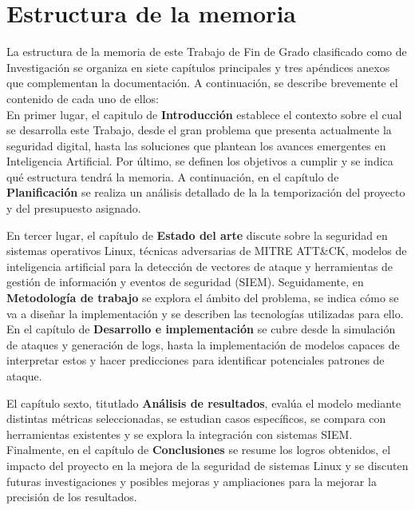 
\section{Estructura de la memoria}

La estructura de la memoria de este Trabajo de Fin de Grado clasificado como de Investigación se organiza en siete capítulos principales y tres apéndices anexos que complementan la documentación. A continuación, se describe brevemente el contenido de cada uno de ellos: \\

En primer lugar, el capitulo de \textbf{Introducción} establece el contexto sobre el cual se desarrolla este Trabajo, desde el gran problema que presenta actualmente la seguridad digital, hasta las soluciones que plantean los avances emergentes en Inteligencia Artificial. Por último, se definen los objetivos a cumplir y se indica qué estructura tendrá la memoria. A continuación, en el capítulo de \textbf{Planificación} se realiza un análisis detallado de la la temporización del proyecto y del presupuesto asignado.

En tercer lugar, el capítulo de \textbf{Estado del arte} discute sobre la seguridad en sistemas operativos Linux, técnicas adversarias de MITRE \gls{ATT&CK}, modelos de inteligencia artificial para la detección de vectores de ataque y herramientas de gestión de información y eventos de seguridad (\gls{SIEM}). Seguidamente, en \textbf{Metodología de trabajo} se explora el ámbito del problema, se indica cómo se va a diseñar la implementación y se describen las tecnologías utilizadas para ello. En el capítulo de \textbf{Desarrollo e implementación} se cubre desde la simulación de ataques y generación de logs, hasta la implementación de modelos capaces de interpretar estos y hacer predicciones para identificar potenciales patrones de ataque.

El capítulo sexto, titutlado \textbf{Análisis de resultados}, evalúa el modelo mediante distintas métricas seleccionadas, se estudian casos específicos, se compara con herramientas existentes y se explora la integración con sistemas \gls{SIEM}. Finalmente, en el capítulo de \textbf{Conclusiones} se resume los logros obtenidos, el impacto del proyecto en la mejora de la seguridad de sistemas Linux y se discuten futuras investigaciones y posibles mejoras y ampliaciones para la mejorar la precisión de los resultados. 

